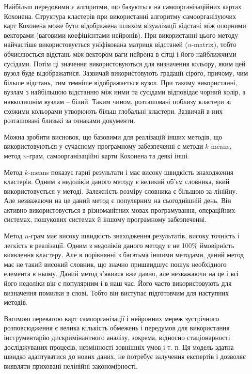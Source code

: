 Найбільш передовими є алгоритми, що базуються на самоорганізаційних картах Кохонена. Структура кластерів при використанні алгоритму самоорганізуючих карт Кохонена може бути відображена шляхом візуалізації відстані між опорними векторами (ваговими коефіцієнтами нейронів). При використанні цього методу найчастіше використовується уніфікована матриця відстаней ($u$-matrix), тобто обчислюється відстань між вектором ваги нейрона в сітці і його найближчими сусідами. Потім ці значення використовуються для визначення кольору, яким цей вузол буде відображатися. Зазвичай використовують градації сірого, причому, чим більше відстань, тим темніше відображається вузол. При такому використанні, вузлам з найбільшою відстанню між ними та сусідами відповідає чорний колір, а навколишнім вузлам – білий. Таким чином, розташовані поблизу кластери зі схожими кольорами утворюють більш глобальні кластери. Зазвичай в них розташовані близькі за ознаками документи.

Можна зробити висновок, що базовими для реалізацій інших методів, що використовуються у сучасному програмному забезпеченні є методи $k$-means, метод $n$-грам, самоорганізаційні карти Кохонена та деякі інші.

Метод $k$-means  показує гарні результати і має високу швидкість знаходження кластерів. Одним з недоліків даного методу є великий об'єм словника, який використовується у методі. Залежність розміру словника є більшою за лінійну. Але незважаючи на це даний метод є популярним на сьогоднішній день. Він активно використовується в різноманітних мовах програмування, операційних системах, пошукових системах й іншому програмному забезпеченні.

Метод $n$-грам має високу швидкість знаходження результатів, високу точність і легкість в реалізації. Одним з недоліків даного методу є не 100\% ймовірність виявлення кластеру. Але в порівнянні з багатьма іншими методами, даний метод має не такий високий словник, що значно пришвидшує пошук необхідного елемента в ньому. Даний метод з'явився вже давно, але незважаючи на це і всі його недоліки він є популярним і в наш час. Його часто використовують для визначення помилки в слові. Тобто він виступає підготовчим для наступних методів.

Вагомою перевагою карт самоорганізації і нейронних мереж зустрічного розповсюдження є велика кількість обмежень і передумов для використання інструментарію дискримінантного аналізу, зокрема, відносно стаціонарності досліджуваних процесів, незмінності зовнішніх умов і т. п. Ця модель здатна швидко адаптуватися до нових даних, не потребує залучення експертів і дозволяє виявляти приховані нелінійні закономірності.

